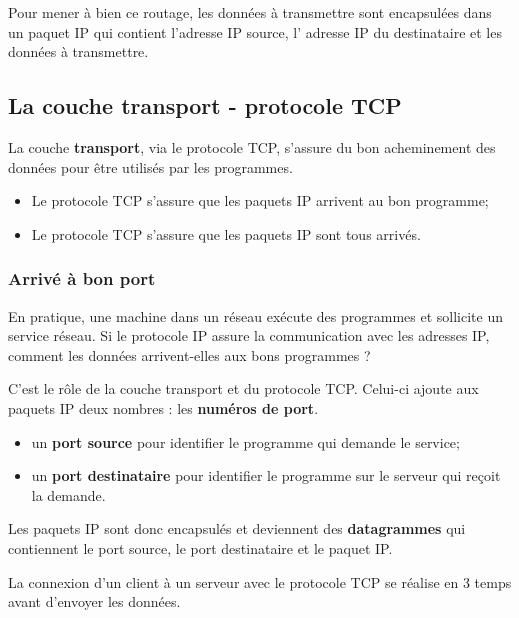 \documentclass[11pt]{article}
\providecommand{\tightlist}{%
      \setlength{\itemsep}{0pt}\setlength{\parskip}{0pt}}
\begin{document}
Pour mener à bien ce routage, les données à transmettre sont encapsulées
dans un paquet IP qui contient l'adresse IP source, l' adresse IP du
destinataire et les données à transmettre.

    \hypertarget{la-couche-transport---protocole-tcp}{%
\subsection{La couche transport - protocole
TCP}\label{la-couche-transport---protocole-tcp}}

La couche \textbf{transport}, via le protocole TCP, s'assure du bon
acheminement des données pour être utilisés par les programmes.

\begin{itemize}
\tightlist
\item
  Le protocole TCP s'assure que les paquets IP arrivent au bon
  programme;
\item
  Le protocole TCP s'assure que les paquets IP sont tous arrivés.
\end{itemize}

\hypertarget{arrivuxe9-uxe0-bon-port}{%
\subsubsection{Arrivé à bon port}\label{arrivuxe9-uxe0-bon-port}}

En pratique, une machine dans un réseau exécute des programmes et
sollicite un service réseau. Si le protocole IP assure la communication
avec les adresses IP, comment les données arrivent-elles aux bons
programmes ?

C'est le rôle de la couche transport et du protocole TCP. Celui-ci
ajoute aux paquets IP deux nombres : les \textbf{numéros de port}.

\begin{itemize}
\tightlist
\item
  un \textbf{port source} pour identifier le programme qui demande le
  service;
\item
  un \textbf{port destinataire} pour identifier le programme sur le
  serveur qui reçoit la demande.
\end{itemize}

Les paquets IP sont donc encapsulés et deviennent des
\textbf{datagrammes} qui contiennent le port source, le port
destinataire et le paquet IP.

La connexion d'un client à un serveur avec le protocole TCP se réalise
en 3 temps avant d'envoyer les données.
\end{document}
